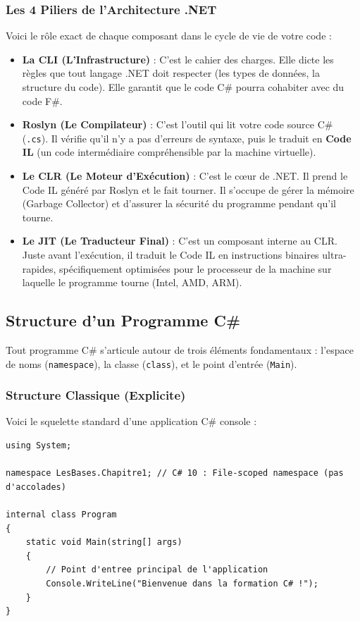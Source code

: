 \subsubsection{Les 4 Piliers de l'Architecture .NET}

Voici le rôle exact de chaque composant dans le cycle de vie de votre code :

\begin{itemize}
    \item \textbf{La CLI (L'Infrastructure)} : C'est le cahier des charges. Elle dicte les règles que tout langage .NET doit respecter (les types de données, la structure du code). Elle garantit que le code C\# pourra cohabiter avec du code F\#.
    \item \textbf{Roslyn (Le Compilateur)} : C'est l'outil qui lit votre code source C\# (\texttt{.cs}). Il vérifie qu'il n'y a pas d'erreurs de syntaxe, puis le traduit en \textbf{Code IL} (un code intermédiaire compréhensible par la machine virtuelle).
    \item \textbf{Le CLR (Le Moteur d'Exécution)} : C'est le cœur de .NET. Il prend le Code IL généré par Roslyn et le fait tourner. Il s'occupe de gérer la mémoire (Garbage Collector) et d'assurer la sécurité du programme pendant qu'il tourne.
    \item \textbf{Le JIT (Le Traducteur Final)} : C'est un composant interne au CLR. Juste avant l'exécution, il traduit le Code IL en instructions binaires ultra-rapides, spécifiquement optimisées pour le processeur de la machine sur laquelle le programme tourne (Intel, AMD, ARM).
\end{itemize}

\subsection{Structure d'un Programme C\#}

Tout programme C\# s'articule autour de trois éléments fondamentaux : l'espace de noms (\texttt{namespace}), la classe (\texttt{class}), et le point d'entrée (\texttt{Main}).

\subsubsection{Structure Classique (Explicite)}

Voici le squelette standard d'une application C\# console :

\begin{lstlisting}[caption={Structure classique d'un fichier C\# (Program.cs)}]
using System;

namespace LesBases.Chapitre1; // C# 10 : File-scoped namespace (pas d'accolades)

internal class Program
{
    static void Main(string[] args)
    {
        // Point d'entree principal de l'application
        Console.WriteLine("Bienvenue dans la formation C# !");
    }
}
\end{lstlisting}

